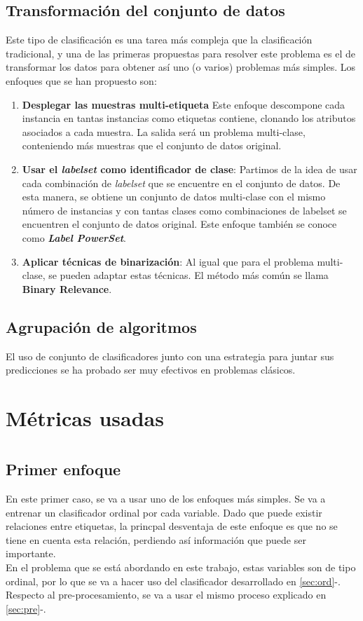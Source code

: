 \subsection{Transformación del conjunto de datos}
Este tipo de clasificación es una tarea más compleja que la clasificación tradicional, y una de las primeras propuestas para resolver este problema es el de transformar los datos para obtener así uno (o varios) problemas más simples.
Los enfoques que se han propuesto son:
\begin{enumerate}
	\item \textbf{Desplegar las muestras multi-etiqueta} Este enfoque descompone cada instancia en tantas instancias como etiquetas contiene, clonando los atributos asociados a cada muestra. La salida será un problema multi-clase, conteniendo más muestras que el conjunto de datos original.
	\item \textbf{Usar el \textit{labelset} como identificador de clase}: Partimos de la idea de usar cada combinación de \textit{labelset} que se encuentre en el conjunto de datos. De esta manera, se obtiene un conjunto de datos multi-clase con el mismo número de instancias y con tantas clases como combinaciones de labelset se encuentren el conjunto de datos original. Este enfoque también se conoce como \textbf{\textit{Label PowerSet}}.
	\item \textbf{Aplicar técnicas de binarización}: Al igual que para el problema multi-clase, se pueden adaptar estas técnicas. El método más común se llama \textbf{Binary Relevance}.
\end{enumerate}
\subsection{Agrupación de algoritmos}
El uso de conjunto de clasificadores junto con una estrategia para juntar sus predicciones se ha probado ser muy efectivos en problemas clásicos.
\section{Métricas usadas}
\section{}
\subsection{Primer enfoque}
En este primer caso, se va a usar uno de los enfoques más simples. Se va a entrenar un clasificador ordinal por cada variable.
Dado que puede existir relaciones entre etiquetas, la princpal desventaja de este enfoque es que no se tiene en cuenta esta relación, perdiendo así información que puede ser importante.\\
\linebreak
En el problema que se está abordando en este trabajo, estas variables son de tipo ordinal, por lo que se va a hacer uso del clasificador desarrollado en \ref{sec:ord}-.
Respecto al pre-procesamiento, se va a usar el mismo proceso explicado en \ref{sec:pre}-.
